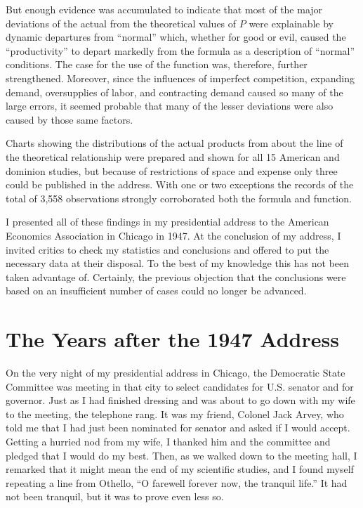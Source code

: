 \documentclass{article}
\begin{document}
But enough evidence was accumulated to indicate that most of the major deviations of the actual from the theoretical values of \(P\) were explainable by dynamic departures from ``normal'' which, whether for good or evil, caused the ``productivity'' to depart markedly from the formula as a description of ``normal'' conditions. The case for the use of the function was, therefore, further strengthened. Moreover, since the influences of imperfect competition, expanding demand, oversupplies of labor, and contracting demand caused so many of the large errors, it seemed probable that many of the lesser deviations were also caused by those same factors.

Charts showing the distributions of the actual products from about the line of the theoretical relationship were prepared and shown for all 15 American and dominion studies, but because of restrictions of space and expense only three could be published in the address. With one or two exceptions the records of the total of 3,558 observations strongly corroborated both the formula and function.

I presented all of these findings in my presidential address to the American Economics Association in Chicago in 1947. At the conclusion of my address, I invited critics to check my statistics and conclusions and offered to put the necessary data at their disposal. To the best of my knowledge this has not been taken advantage of. Certainly, the previous objection that the conclusions were based on an insufficient number of cases could no longer be advanced.  

\section*{The Years after the 1947 Address}

On the very night of my presidential address in Chicago, the Democratic State Committee was meeting in that city to select candidates for U.S. senator and for governor. Just as I had finished dressing and was about to go down with my wife to the meeting, the telephone rang. It was my friend, Colonel Jack Arvey, who told me that I had just been nominated for senator and asked if I would accept. Getting a hurried nod from my wife, I thanked him and the committee and pledged that I would do my best. Then, as we walked down to the meeting hall, I remarked that it might mean the end of my scientific studies, and I found myself repeating a line from Othello, ``O farewell forever now, the tranquil life.'' It had not been tranquil, but it was to prove even less so.
\end{document}
